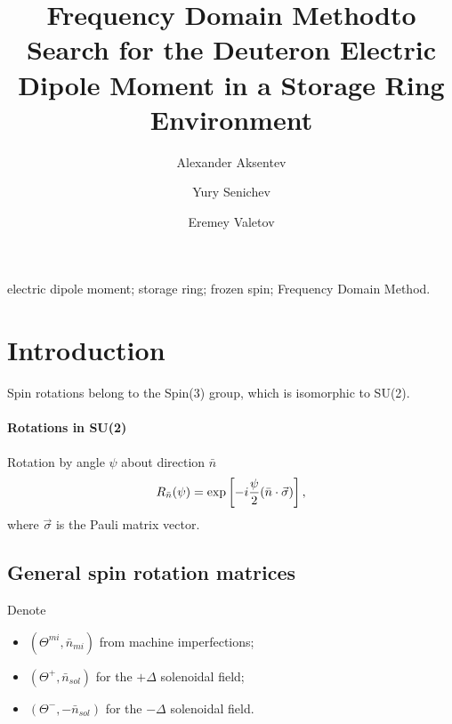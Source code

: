 \documentclass[12pt]{elsarticle}
\newcommand{\nbar}{\bar n}
\newcommand{\D}{\Delta}
\newcommand{\vsig}{\vec\sigma}
\newcommand{\tmi}{\Theta^{mi}}
\newcommand{\nbmi}{\nbar_{mi}}
\newcommand{\tsp}{\Theta^+}
\newcommand{\tsm}{\Theta^-}
\newcommand{\nbsol}{\nbar_{sol}}
\newcommand{\FDM}{Frequency Domain Method} %
\begin{document}
\begin{frontmatter}
\title{\FDM to Search for the Deuteron Electric Dipole Moment in a Storage Ring Environment}

\author[FZJ,INR,MEPHI]{Alexander Aksentev}

\author[INR]{Yury Senichev}

\author[MSU]{Eremey Valetov}


\address[FZJ]{Institut f\"ur Kernphysik (IKP-2), Forschungszentrum J\"ulich,
  J\"ulich, Germany}
\address[INR]{Institute for Nuclear Research of the Russian Academy of Sciences,
  Moscow, Russia}
\address[MEPHI]{National Research Nuclear University ``MEPhI,''
  Moscow, Russia}
\address[MSU]{Department of Physics and Astronomy, Michigan State University,
  MI 48824, USA}


\begin{abstract}

\end{abstract}


\maketitle

\begin{keyword}
  electric dipole moment; storage ring; frozen spin; \FDM.
\end{keyword}

\end{frontmatter}

\tableofcontents
\linenumbers

\section{Introduction}
Spin rotations belong to the Spin(3) group, which is isomorphic to SU(2).
\paragraph{Rotations in SU(2)}
Rotation by angle $\psi$ about direction $\nbar$
\[
R_{\nbar}(\psi) = \exp\bkt*{-i\frac\psi2 (\nbar\cdot\vsig)},
\]
where $\vsig$ is the Pauli matrix vector.

\subsection{General spin rotation matrices}
Denote
\begin{itemize}
\item $(\tmi, \nbmi)$ from machine imperfections;
\item $(\tsp, \nbsol)$ for the $+\D$ solenoidal field;
\item $(\tsm, -\nbsol)$ for the $-\D$ solenoidal field.
\end{itemize}
\end{document}
